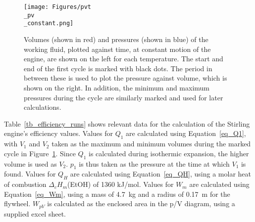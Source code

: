 \documentclass[titlepage]{article}
\begin{document}
\begin{figure}[H]
    \centering
    \texttt{[image: Figures/pvt\\\_pv\\\_constant.png]}
    \caption{Volumes (shown in red) and pressures (shown in blue) of the working fluid, plotted against time, at constant motion of the engine, are shown on the left for each temperature. The start and end of the first cycle is marked with black dots. The period in between these is used to plot the pressure against volume, which is shown on the right. In addition, the minimum and maximum pressures during the cycle are similarly marked and used for later calculations.}
    \label{fig_constant_pvt_pv}
\end{figure}

\newpage
\noindent Table~\ref{tb_efficiency_runs} shows relevant data for the calculation of the Stirling engine's efficiency values. Values for \(Q_1\) are calculated using Equation~\ref{eq_Q1}, with \(V_1\) and \(V_2\) taken as the maximum and minimum volumes during the marked cycle in Figure~\ref{fig_constant_pvt_pv}. Since \(Q_1\) is calculated during isothermic expansion, the higher volume is used as \(V_2\). \(p_1\) is thus taken as the pressure at the time at which \(V_1\) is found. Values for \(Q_H\) are calculated using Equation~\ref{eq_QH}, using a molar heat of combustion \(\Delta_c H_m\)(EtOH) of 1360 kJ/mol. Values for \(W_m\) are calculated using Equation~\ref{eq_Wm}, using a mass of 4.7~kg and a radius of 0.17~m for the flywheel. \(W_{pV}\) is calculated as the enclosed area in the p/V diagram, using a supplied excel sheet.
\end{document}
